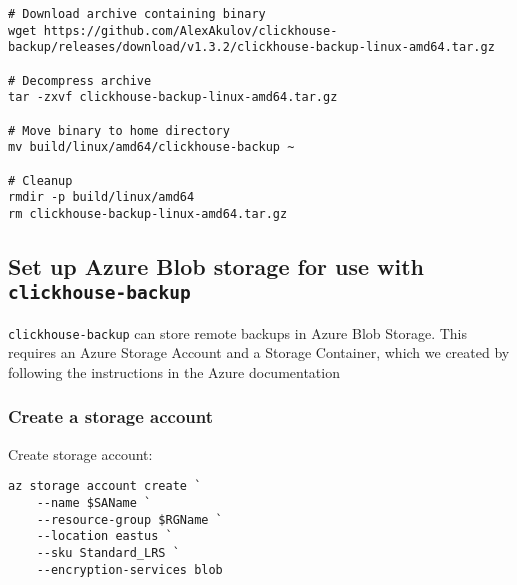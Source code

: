 \begin{verbatim}
# Download archive containing binary
wget https://github.com/AlexAkulov/clickhouse-backup/releases/download/v1.3.2/clickhouse-backup-linux-amd64.tar.gz

# Decompress archive
tar -zxvf clickhouse-backup-linux-amd64.tar.gz

# Move binary to home directory
mv build/linux/amd64/clickhouse-backup ~

# Cleanup
rmdir -p build/linux/amd64
rm clickhouse-backup-linux-amd64.tar.gz
\end{verbatim}
\subsection{Set up Azure Blob storage for use with \texttt{clickhouse-backup}}
\label{sec:org929d868}
\texttt{clickhouse-backup} can store remote backups in Azure Blob Storage.
This requires an Azure Storage Account and a Storage Container,
which we created by following the instructions in the Azure documentation \cite{stevenmatthew_quickstart_nodate}

\subsubsection{Create a storage account}
\label{sec:org292fd33}
Create storage account:
\begin{verbatim}
az storage account create `
    --name $SAName `
    --resource-group $RGName `
    --location eastus `
    --sku Standard_LRS `
    --encryption-services blob
\end{verbatim}

